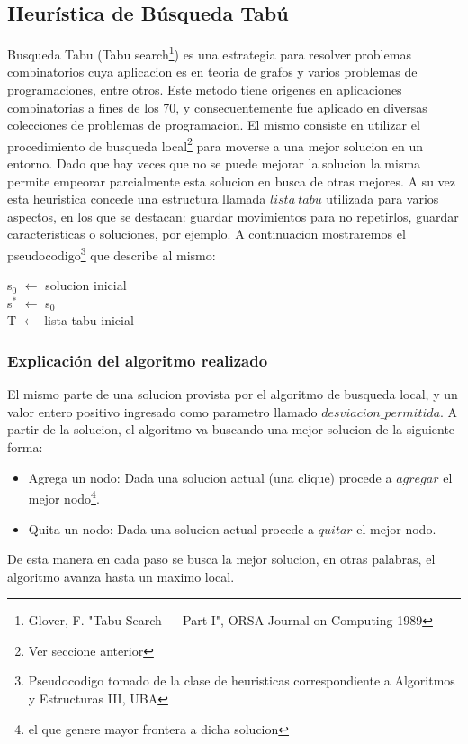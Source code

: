 \subsection{Heurística de Búsqueda Tabú}

 Busqueda Tabu (Tabu search\footnote{Glover, F. "Tabu Search — Part I", ORSA Journal on Computing 1989}) es una estrategia para resolver problemas combinatorios cuya aplicacion es en teoria de grafos y varios problemas de programaciones, entre otros. Este metodo tiene origenes en aplicaciones combinatorias a fines de los 70, y consecuentemente fue aplicado en diversas colecciones de problemas de programacion. El mismo consiste en utilizar el procedimiento de busqueda local\footnote{Ver seccione anterior} para moverse a una mejor solucion en un entorno. Dado que hay veces que no se puede mejorar la solucion la misma permite empeorar parcialmente esta solucion en busca de otras mejores. A su vez esta heuristica concede una estructura llamada $lista\ tabu$ utilizada para varios aspectos, en los que se destacan: guardar movimientos para no repetirlos, guardar caracteristicas o soluciones, por ejemplo. A continuacion mostraremos el pseudocodigo\footnote{Pseudocodigo tomado de la clase de heuristicas correspondiente a Algoritmos y Estructuras III, UBA} que describe al mismo:

\begin{algorithm}[H]
\SetAlgoLined
s$_{0}$ $\leftarrow$ solucion inicial \\
s$^{*}$ $\leftarrow$ s$_{0}$ \\
T $\leftarrow$ lista tabu inicial \\
\end{algorithm}



\subsubsection{Explicación del algoritmo realizado}

 El mismo parte de una solucion provista por el algoritmo de busqueda local, y un valor entero positivo ingresado como parametro llamado $desviacion\_permitida$. A partir de la solucion, el algoritmo va buscando una mejor solucion de la siguiente forma:
\begin{itemize}
 \item Agrega un nodo: Dada una solucion actual (una clique) procede a $agregar$ el mejor nodo\footnote{el que genere mayor frontera a dicha solucion}.
 \item Quita un nodo: Dada una solucion actual procede a $quitar$ el mejor nodo.
\end{itemize}
 De esta manera en cada paso se busca la mejor solucion, en otras palabras, el algoritmo avanza hasta un maximo local. \newline

